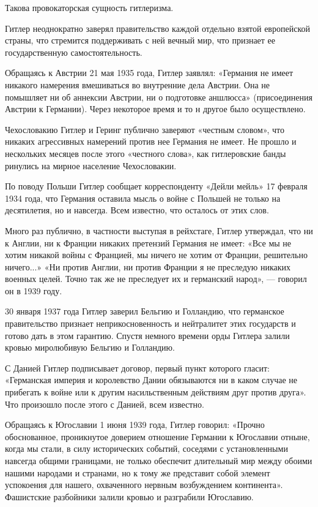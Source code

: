 \documentclass[12pt, a4paper, openany]{book}
\begin{document}
Такова провокаторская сущность гитлеризма.

Гитлер неоднократно заверял правительство каждой отдельно взятой европейской страны, что стремится поддерживать с ней вечный мир, что признает ее государственную самостоятельность.

Обращаясь к Австрии 21 мая 1935 года, Гитлер заявлял: «Германия не имеет никакого намерения вмешиваться во внутренние дела Австрии. Она не помышляет ни об аннексии Австрии, ни о подготовке аншлюсса» (присоединения Австрии к Германии). Через некоторое время и то н другое было осуществлено.

Чехословакию Гитлер и Геринг публично заверяют «честным словом», что никаких агрессивных намерений против нее Германия не имеет. Не прошло и нескольких месяцев после этого «честного слова», как гитлеровские банды ринулись на мирное население Чехословакии.

По поводу Польши Гитлер сообщает корреспонденту «Дейли мейль» 17 февраля 1934 года, что Германия оставила мысль о войне с Польшей не только на десятилетия, но и навсегда. Всем известно, что осталось от этих слов.

Много раз публично, в частности выступая в рейхстаге, Гитлер утверждал, что ни к Англии, ни к Франции никаких претензий Германия не имеет: «Все мы не хотим никакой войны с Францией, мы ничего не хотим от Франции, решительно ничего...» «Ни против Англии, ни против Франции я не преследую никаких военных целей. Точно так же не преследует их и германский народ», — говорил он в 1939 году.

30 января 1937 года Гитлер заверил Бельгию и Голландию, что германское правительство признает неприкосновенность и нейтралитет этих государств и готово дать в этом гарантию. Спустя немного времени орды Гитлера залили кровью миролюбивую Бельгию и Голландию.

С Данией Гитлер подписывает договор, первый пункт которого гласит: «Германская империя и королевство Дании обязываются ни в каком случае не прибегать к войне или к другим насильственным действиям друг против друга». Что произошло после этого с Данией, всем известно.

Обращаясь к Югославии 1 июня 1939 года, Гитлер говорил: «Прочно обоснованное, проникнутое доверием отношение Германии к Югославии отныне, когда мы стали, в силу исторических событий, соседями с установленными навсегда общими границами, не только обеспечит длительный мир между обоими нашими народами и странами, но к тому же представит собой элемент успокоения для нашего, охваченного нервным возбуждением континента». Фашистские разбойники залили кровью и разграбили Югославию.
\end{document}
